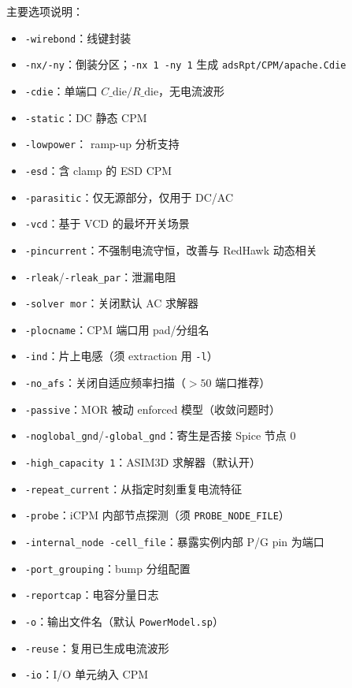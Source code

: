 主要选项说明：
\begin{itemize}
  \item \texttt{-wirebond}：线键封装
  \item \texttt{-nx/-ny}：倒装分区；\texttt{-nx 1 -ny 1} 生成 \texttt{adsRpt/CPM/apache.Cdie}
  \item \texttt{-cdie}：单端口 $C\_{\mathrm{die}}/R\_{\mathrm{die}}$，无电流波形
  \item \texttt{-static}：DC 静态 CPM
  \item \texttt{-lowpower}： ramp-up 分析支持
  \item \texttt{-esd}：含 clamp 的 ESD CPM
  \item \texttt{-parasitic}：仅无源部分，仅用于 DC/AC
  \item \texttt{-vcd}：基于 VCD 的最坏开关场景
  \item \texttt{-pincurrent}：不强制电流守恒，改善与 RedHawk 动态相关
  \item \texttt{-rleak}/\texttt{-rleak\_par}：泄漏电阻
  \item \texttt{-solver mor}：关闭默认 AC 求解器
  \item \texttt{-plocname}：CPM 端口用 pad/分组名
  \item \texttt{-ind}：片上电感（须 extraction 用 \texttt{-l}）
  \item \texttt{-no\_afs}：关闭自适应频率扫描（$>50$ 端口推荐）
  \item \texttt{-passive}：MOR 被动 enforced 模型（收敛问题时）
  \item \texttt{-noglobal\_gnd}/\texttt{-global\_gnd}：寄生是否接 Spice 节点 0
  \item \texttt{-high\_capacity 1}：ASIM3D 求解器（默认开）
  \item \texttt{-repeat\_current}：从指定时刻重复电流特征
  \item \texttt{-probe}：iCPM 内部节点探测（须 \texttt{PROBE\_NODE\_FILE}）
  \item \texttt{-internal\_node -cell\_file}：暴露实例内部 P/G pin 为端口
  \item \texttt{-port\_grouping}：bump 分组配置
  \item \texttt{-reportcap}：电容分量日志
  \item \texttt{-o}：输出文件名（默认 \texttt{PowerModel.sp}）
  \item \texttt{-reuse}：复用已生成电流波形
  \item \texttt{-io}：I/O 单元纳入 CPM
\end{itemize}

